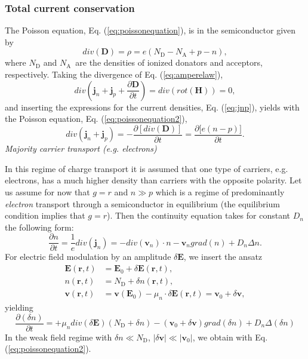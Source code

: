 \subsubsection{Total current conservation\newline }

The Poisson equation, Eq. (\ref{eq:poissonequation}), is in the semiconductor
given by%
\begin{equation}
div\left(  \mathbf{D}\right)  =\rho=e\left(  N_{\mathrm{D}}-N_{\mathrm{A}%
}+p-n\right)  , \label{eq:poissonequation2}%
\end{equation}
where $N_{\mathrm{D}}$ and $N_{\mathrm{A}}$\ are the densities of ionized
donators and acceptors, respectively. Taking the divergence of Eq.
(\ref{eq:amperelaw}),%
\[
div\left(  \mathbf{j}_{n}+\mathbf{j}_{p}+\frac{\partial\mathbf{D}}{\partial
t}\right)  =div\left(  rot(\mathbf{H})\right)  =0,
\]
and inserting the expressions for the current densities, Eq. (\ref{eq:jnp}),
yields with the Poisson equation, Eq. (\ref{eq:poissonequation2}),
\[
div\left(  \mathbf{j}_{n}+\mathbf{j}_{p}\right)  =-\frac{\partial\left[
div\left(  \mathbf{D}\right)  \right]  }{\partial t}=\frac{\partial\lbrack
e(n-p)]}{\partial t}.
\]
\newline \newline \emph{Majority carrier transport (e.g. electrons)} \newline 

In this regime of charge transport it is assumed that one type of carriers,
e.g. electrons, has a much higher density than carriers with the opposite
polarity. Let us assume for now that $g=r$ and $n\gg p$ which is a regime of
predominantly \emph{electron} transport through a semiconductor in equilibrium
(the equilibrium condition implies that $g=r$). Then the continuity equation
takes for constant $D_{n}$ the following form:
\[
\frac{\partial n}{\partial t}=\frac{1}{e}div\left(  \mathbf{j}_{n}\right)
=-div\left(  \mathbf{v}_{n}\right)  \cdot n-\mathbf{v}_{n}grad\left(
n\right)  +D_{n}\Delta n.
\]
For electric field modulation by an amplitude $\delta\mathbf{E}$, we insert
the ansatz%
\begin{align*}
\mathbf{E}\left(  \mathbf{r},t\right)   &  =\mathbf{E}_{0}+\delta
\mathbf{E}\left(  \mathbf{r},t\right)  ,\\
n\left(  \mathbf{r},t\right)   &  =N_{\mathrm{D}}+\delta n\left(
\mathbf{r},t\right)  ,\\
\mathbf{v}\left(  \mathbf{r},t\right)   &  =\mathbf{v}\left(  \mathbf{E}%
_{0}\right)  -\mu_{n}\cdot\delta\mathbf{E}\left(  \mathbf{r},t\right)
=\mathbf{v}_{0}+\delta\mathbf{v},
\end{align*}
yielding%
\[
\frac{\partial\left(  \delta n\right)  }{\partial t}=+\mu_{n}div\left(
\delta\mathbf{E}\right)  (N_{\mathrm{D}}+\delta n)-(\mathbf{v}_{0}%
+\delta\mathbf{v})grad\left(  \delta n\right)  +D_{n}\Delta\left(  \delta
n\right)
\]
In the weak field regime with $\delta n\ll N_{\mathrm{D}}$, $|\delta
\mathbf{v}|\ll|\mathbf{v}_{0}|$, we obtain with Eq. (\ref{eq:poissonequation2}).%


